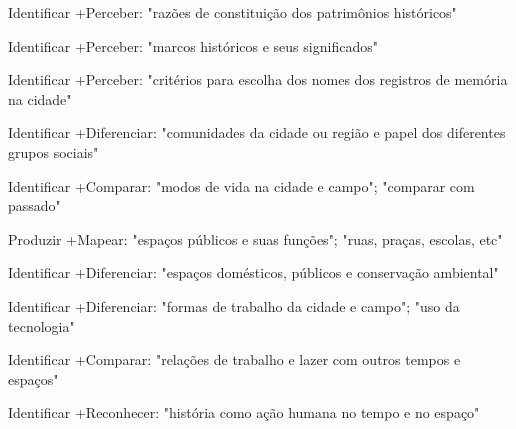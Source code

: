  Identificar +Perceber: "razões de constituição dos patrimônios históricos"

 Identificar +Perceber: "marcos históricos e seus significados"

 Identificar +Perceber: "critérios para escolha dos nomes dos registros de memória na cidade"

 Identificar +Diferenciar: "comunidades da cidade ou região e papel dos diferentes grupos sociais"

 Identificar +Comparar: "modos de vida na cidade e campo"; "comparar com passado"

 Produzir +Mapear: "espaços públicos e suas funções"; "ruas, praças, escolas, etc"

 Identificar +Diferenciar: "espaços domésticos, públicos e conservação ambiental"

 Identificar +Diferenciar: "formas de trabalho da cidade e campo"; "uso da tecnologia"

 Identificar +Comparar: "relações de trabalho e lazer com outros tempos e espaços"

 Identificar +Reconhecer: "história como ação humana no tempo e no espaço"

